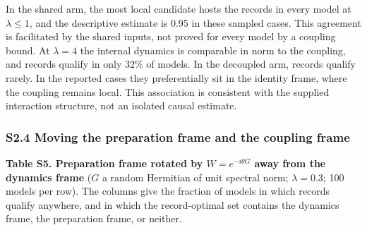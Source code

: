 \documentclass[
  10pt,
  a4paper,
]{article}
\begin{document}
In the shared arm, the most local candidate hosts the records in every
model at \(\lambda\le1\), and the descriptive estimate is \(0.95\) in
these sampled cases. This agreement is facilitated by the shared inputs,
not proved for every model by a coupling bound. At \(\lambda=4\) the
internal dynamics is comparable in norm to the coupling, and records
qualify in only 32\% of models. In the decoupled arm, records qualify
rarely. In the reported cases they preferentially sit in the identity
frame, where the coupling remains local. This association is consistent
with the supplied interaction structure, not an isolated causal
estimate.

\subsubsection{S2.4 Moving the preparation frame and the coupling
frame}\label{s2.4-moving-the-preparation-frame-and-the-coupling-frame}


\textbf{Table S5. Preparation frame rotated by \(W=e^{-i\theta G}\) away
from the dynamics frame} (\(G\) a random Hermitian of unit spectral
norm; \(\lambda=0.3\); 100 models per row). The columns give the
fraction of models in which records qualify anywhere, and in which the
record-optimal set contains the dynamics frame, the preparation frame,
or neither.
\end{document}
